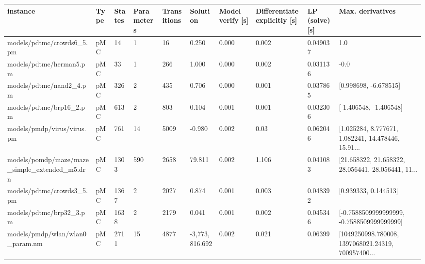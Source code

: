 \begin{tabular}{llllllllll}
\toprule
                                          instance & Type & States & Parameters & Transitions &       Solution & Model verify [s] & Differentiate explicitly [s] & LP (solve) [s] &                                   Max. derivatives \\
\midrule
                         models/pdtmc/crowds6\_5.pm &  pMC &     14 &          1 &          16 &          0.250 &            0.000 &                        0.002 &       0.049037 &                                                1.0 \\
                           models/pdtmc/herman5.pm &  pMC &     33 &          1 &         266 &          1.000 &            0.000 &                        0.002 &       0.031136 &                                               -0.0 \\
                           models/pdtmc/nand2\_4.pm &  pMC &    326 &          2 &         435 &          0.706 &            0.000 &                        0.001 &       0.037865 &                              [0.998698, -6.678515] \\
                           models/pdtmc/brp16\_2.pm &  pMC &    613 &          2 &         803 &          0.104 &            0.001 &                        0.001 &       0.032306 &                             [-1.406548, -1.406548] \\
                        models/pmdp/virus/virus.pm &  pMC &    761 &         14 &        5009 &         -0.980 &            0.002 &                         0.03 &       0.062046 & [1.025284, 8.777671, 1.082241, 14.478446, 15.91... \\
     models/pomdp/maze/maze\_simple\_extended\_m5.drn &  pMC &   1303 &        590 &        2658 &         79.811 &            0.002 &                        1.106 &       0.041083 & [21.658322, 21.658322, 28.056441, 28.056441, 11... \\
                         models/pdtmc/crowds3\_5.pm &  pMC &   1367 &          2 &        2027 &          0.874 &            0.001 &                        0.003 &       0.048392 &                               [0.939333, 0.144513] \\
                           models/pdtmc/brp32\_3.pm &  pMC &   1638 &          2 &        2179 &          0.041 &            0.001 &                        0.002 &       0.045346 &         [-0.7588509999999999, -0.7588509999999999] \\
                   models/pmdp/wlan/wlan0\_param.nm &  pMC &   2711 &         15 &        4877 & -3,773,816.692 &            0.002 &                        0.021 &        0.06399 & [1049250998.780008, 1397068021.24319, 700957400... \\

\end{tabular}
